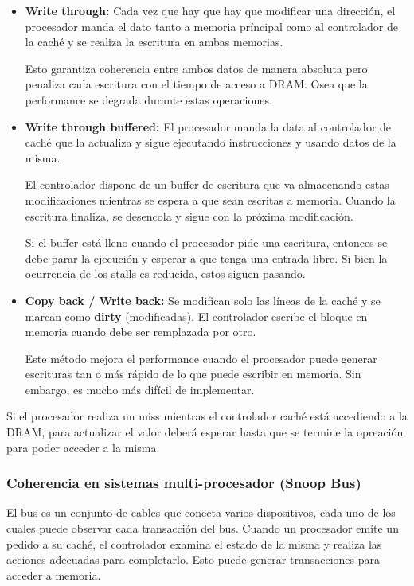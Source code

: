\begin{itemize}
	\item \textbf{Write through:} Cada vez que hay que hay que modificar una dirección, el procesador manda el dato tanto a memoria príncipal como al controlador de la caché y se realiza la escritura en ambas memorias. 
	
	Esto garantiza coherencia entre ambos datos de manera absoluta pero penaliza cada escritura con el tiempo de acceso a DRAM. Osea que la performance se degrada durante estas operaciones.
	
	\item \textbf{Write through buffered:} El procesador manda la data al controlador de caché que la actualiza y sigue ejecutando instrucciones y usando datos de la misma.
	
	El controlador dispone de un buffer de escritura que va almacenando estas modificaciones mientras se espera a que sean escritas a memoria. Cuando la escritura finaliza, se desencola y sigue con la próxima modificación.
	
 	Si el buffer está lleno cuando el procesador pide una escritura, entonces se debe parar la ejecución y esperar a que tenga una entrada libre. Si bien la ocurrencia de los stalls es reducida, estos siguen pasando.
 	
 	\item \textbf{Copy back / Write back:} Se modifican solo las líneas de la caché y se marcan como \textbf{dirty} (modificadas). El controlador escribe el bloque en memoria cuando debe ser remplazada por otro. 
 	
 	Este método mejora el performance cuando el procesador puede generar escrituras tan o más rápido de lo que puede escribir en memoria. Sin embargo, es mucho más difícil de implementar.
\end{itemize}

Si el procesador realiza un miss mientras el controlador caché está accediendo a la DRAM, para actualizar el valor deberá esperar hasta que se termine la opreación para poder acceder a la misma.

\subsubsection{Coherencia en sistemas multi-procesador (Snoop Bus)}
El bus es un conjunto de cables que conecta varios dispositivos, cada uno de los cuales puede observar cada transacción del bus. Cuando un procesador emite un pedido a su caché, el controlador examina el estado de la misma y realiza las acciones adecuadas para completarlo. Esto puede generar transacciones para acceder a memoria.

